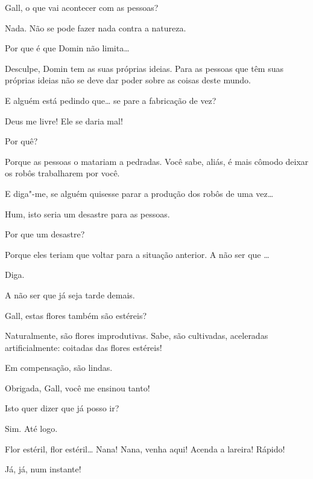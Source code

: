  Gall, o que vai acontecer com as pessoas?

 Nada. Não se pode fazer nada contra a natureza.

 Por que é que Domin não limita\ldots{}

 Desculpe, Domin tem as suas próprias ideias. Para as pessoas que têm
suas próprias ideias não se deve dar poder sobre as coisas deste mundo.

 E alguém está pedindo que\ldots{} se pare a fabricação de vez?

 Deus me livre! Ele se daria mal!

 Por quê?

 Porque as pessoas o matariam a pedradas. Você sabe, aliás, é mais
cômodo deixar os robôs trabalharem por você.

  E diga"-me, se alguém quisesse parar a produção dos
robôs de uma vez\ldots{}

  Hum, isto seria um desastre para as pessoas.

 Por que um desastre?

 Porque eles teriam que voltar para a situação anterior. A não ser que
\ldots{}

 Diga.

 A não ser que já seja tarde demais.

  Gall, estas flores também são
estéreis?

  Naturalmente, são flores improdutivas. Sabe, são
cultivadas, aceleradas artificialmente: coitadas das flores estéreis!

 Em compensação, são lindas.

  Obrigada, Gall, você me ensinou tanto!

  Isto quer dizer que já posso ir?

 Sim. Até logo.

  Flor estéril, flor estéril\ldots{}  Nana!  Nana, venha aqui! Acenda a lareira! Rápido!

 Já, já, num instante!

